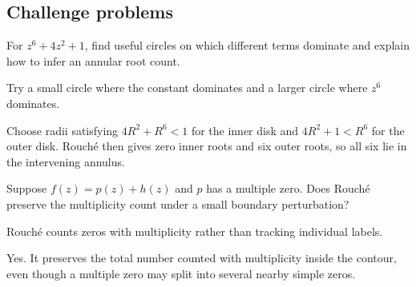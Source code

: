 \subsection*{Challenge problems}

\begin{exercise}\label{exr:iv13-expand-15}
For \(z^6+4z^2+1\), find useful circles on which different terms dominate and explain how to infer an annular root count.
\end{exercise}
\begin{hint}
Try a small circle where the constant dominates and a larger circle where \(z^6\) dominates.
\end{hint}
\begin{solution}
Choose radii satisfying \(4R^2+R^6<1\) for the inner disk and \(4R^2+1<R^6\) for the outer disk. Rouché then gives zero inner roots and six outer roots, so all six lie in the intervening annulus.
\end{solution}

\begin{exercise}\label{exr:iv13-expand-16}
Suppose \(f(z)=p(z)+h(z)\) and \(p\) has a multiple zero. Does Rouché preserve the multiplicity count under a small boundary perturbation?
\end{exercise}
\begin{hint}
Rouché counts zeros with multiplicity rather than tracking individual labels.
\end{hint}
\begin{solution}
Yes. It preserves the total number counted with multiplicity inside the contour, even though a multiple zero may split into several nearby simple zeros.
\end{solution}

